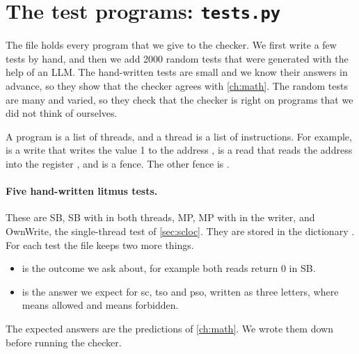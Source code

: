 \section{The test programs: \texttt{tests.py}}
\label{sec:testsfile}

The file  holds every program that we give to the checker. We first write a few tests by hand, and then we add 2000 random tests that were generated with the help of an LLM. The hand-written tests are small and we know their answers in advance, so they show that the checker agrees with \cref{ch:math}. The random tests are many and varied, so they check that the checker is right on programs that we did not think of ourselves.

A program is a list of threads, and a thread is a list of instructions. For example,  is a write that writes the value 1 to the address ,  is a read that reads the address  into the register , and  is a \gls{fence}. The other fence is .

\paragraph{Five hand-written litmus tests.} These are SB, SB with  in both threads, MP, MP with  in the writer, and OwnWrite, the single-thread test of \cref{sec:scloc}. They are stored in the dictionary . For each test the file keeps two more things.
\begin{itemize}
\item {} is the outcome we ask about, for example both reads return 0 in SB.
\item {} is the answer we expect for \gls{sc}, \gls{tso} and \gls{pso}, written as three letters, where  means allowed and  means forbidden.
\end{itemize}
The expected answers are the predictions of \cref{ch:math}. We wrote them down before running the checker.

